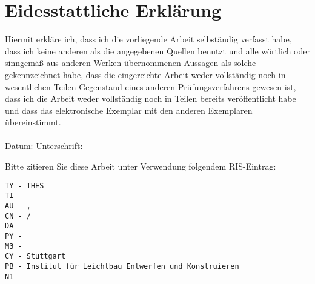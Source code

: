 \chapter*{Eidesstattliche Erklärung}
\label{erklaerung}
Hiermit erkläre ich, dass ich die vorliegende Arbeit selbständig verfasst habe, dass ich keine anderen als die angegebenen Quellen benutzt und alle wörtlich oder sinngemäß aus anderen Werken übernommenen Aussagen als solche gekennzeichnet habe, dass die eingereichte Arbeit weder vollständig noch in wesentlichen Teilen Gegenstand eines anderen Prüfungsverfahrens gewesen ist, dass ich die Arbeit weder vollständig noch in Teilen bereits veröffentlicht habe und dass das elektronische Exemplar mit den anderen Exemplaren übereinstimmt. \\
\\[1.5cm]
Datum:	\hrulefill\enspace Unterschrift: \hrulefill
\\[3.5cm]

\vfill

Bitte zitieren Sie diese Arbeit unter Verwendung folgendem RIS-Eintrag:

\texttt{TY  - THES \\
TI  - \TitelDerArbeit \\
AU  - \StudentNachname, \StudentVorname \\
CN  - \NummerDerArbeit/ \\
DA  - \Abgabedatum \\
PY  - \EndeJahr \\
M3  - \TypDerArbeit \\
CY  - Stuttgart \\
PB  - Institut für Leichtbau Entwerfen und Konstruieren \\
N1  - \Betreuer
}
